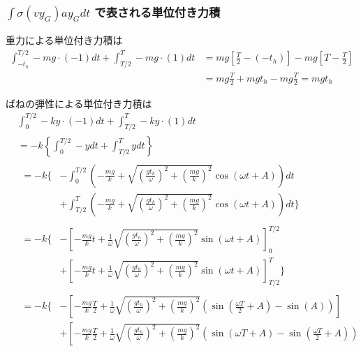 \documentclass[a4paper,11pt]{jsarticle}
\begin{document}
\subsubsection{$\int\sigma (vy_G)ay_G dt$ で表される単位付き力積}
重力による単位付き力積は
\begin{align}
  \int_{-t_h}^{T/2} -mg \cdot (-1) dt
  + \int_{T/2}^{T} -mg \cdot (1) dt
   & = mg\left[ \frac{T}{2} - (-t_h) \right] - mg \left[ T - \frac{T}{2} \right]
  \\
   & = mg\frac{T}{2} + mgt_h - mg\frac{T}{2} = mgt_h
\end{align}

ばねの弾性による単位付き力積は
\begin{align}
   & \int_{0}^{T/2} -ky \cdot (-1) dt
  + \int_{T/2}^{T} -ky \cdot (1) dt
  \\
   & = -k \left\{
  \int_{0}^{T/2} -y dt + \int_{T/2}^{T} y dt
  \right\}
  \\
   &
  \begin{aligned}
    = -k \Bigg\{
     & - \int_{0}^{T/2} \left(
    -\frac{mg}{k} + \sqrt{\left(\frac{gt_h}{\omega}\right)^2 + \left(\frac{mg}{k}\right)^2}\cos \left( \omega t + A \right)
    \right) dt
    \\
     & + \int_{T/2}^{T} \left(
    -\frac{mg}{k} + \sqrt{\left(\frac{gt_h}{\omega}\right)^2 + \left(\frac{mg}{k}\right)^2}\cos \left( \omega t + A \right)
    \right) dt \Bigg\}
  \end{aligned}
  \\
   & \begin{aligned}
       = -k \Bigg\{
        & - \left[
         -\frac{mg}{k}t + \frac{1}{\omega} \sqrt{\left(\frac{gt_h}{\omega}\right)^2 + \left(\frac{mg}{k}\right)^2} \sin (\omega t + A)
         \right]_0^{T/2}
       \\
        & + \left[
         -\frac{mg}{k}t + \frac{1}{\omega} \sqrt{\left(\frac{gt_h}{\omega}\right)^2 + \left(\frac{mg}{k}\right)^2} \sin (\omega t + A)
         \right]_{T/2}^T
       \Bigg\}
     \end{aligned}
  \\
   & \begin{aligned}
       = -k \Bigg\{
        & - \left[
         -\frac{mg}{k}\frac{T}{2} + \frac{1}{\omega} \sqrt{\left(\frac{gt_h}{\omega}\right)^2 + \left(\frac{mg}{k}\right)^2} (\sin(\frac{\omega T}{2} + A) - \sin(A))
         \right]
       \\
        & + \left[
         -\frac{mg}{k}\frac{T}{2} + \frac{1}{\omega} \sqrt{\left(\frac{gt_h}{\omega}\right)^2 + \left(\frac{mg}{k}\right)^2} (\sin(\omega T + A) - \sin(\frac{\omega T}{2} + A))

\end{aligned}
\end{align}
\end{document}
